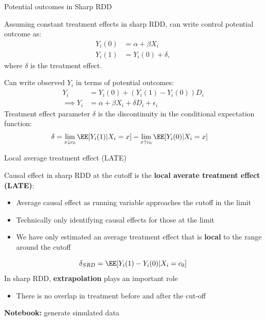 \documentclass[compress, 8pt]{beamer}
\begin{document}
\begin{frame}{Potential outcomes in Sharp RDD}

Assuming constant treatment effects in sharp RDD, can write control potential outcome as:
\begin{align*}
    Y_i (0) &= \alpha + \beta X_i \\
    Y_i (1) &= Y_i (0) + \delta,
\end{align*}
where $\delta$ is the treatment effect. 

\vspace{3ex}
Can write observed $Y_i$ in terms of potential outcomes:
\begin{align*}
    Y_i &= Y_i (0) + (Y_i (1) - Y_i (0)) D_i \\
    \implies Y_i &= \alpha + \beta X_i + \delta D_i + \epsilon_i
\end{align*}
Treatment effect parameter $\delta$ is the discontinuity in the conditional expectation function:
\begin{align*}
    \delta &= \lim_{x \downarrow c_0} \EE [Y_i (1) \vert X_i = x]
    - \lim_{x \uparrow c_0} \EE [Y_i (0) \vert X_i = x]
\end{align*}

\end{frame}

\begin{frame}{Local average treatment effect (LATE)}

Causal effect in sharp RDD at the cutoff is the \textbf{local averate treatment effect (LATE)}: 
\begin{itemize}
    \item Average causal effect as running variable approaches the cutoff in the limit
    \item Technically only identifying causal effects for those at the limit
    \item We have only estimated an average treatment effect that is \textbf{local} to the range around the cutoff
\end{itemize}
\begin{equation*}
    \delta_{SRD} = \EE [Y_i (1) - Y_i(0) \vert X_i = c_0]
\end{equation*}
In sharp RDD, \textbf{extrapolation} plays an important role
\begin{itemize}
    \item There is no overlap in treatment before and after the cut-off
\end{itemize}
\textbf{Notebook: } generate simulated data


\end{frame}
\end{document}
